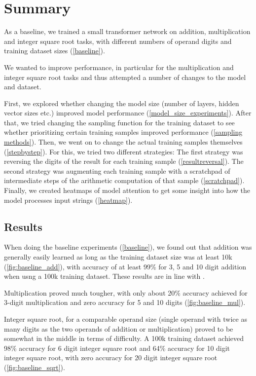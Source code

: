\section{Summary}

As a baseline, we trained a small transformer network on addition, multiplication and integer square root tasks, with different numbers of operand digits and training dataset sizes (\cref{baseline}).

We wanted to improve performance, in particular for the multiplication and integer square root tasks and thus attempted a number of changes to the model and dataset.

First, we explored whether changing the model size (number of layers, hidden vector sizes etc.) improved model performance (\cref{model_size_experiments}).
After that, we tried changing the sampling function for the training dataset to see whether prioritizing certain training samples improved performance (\cref{sampling methods}).
Then, we went on to change the actual training samples themselves (\cref{stepbystep}). For this, we tried two different strategies:
The first strategy was reversing the digits of the result for each training sample (\cref{resultreversal}).
The second strategy was augmenting each training sample with a scratchpad of intermediate steps of the arithmetic computation of that sample (\cref{scratchpad}).
Finally, we created heatmaps of model attention to get some insight into how the model processes input strings (\cref{heatmap}).

\subsection{Results}
When doing the baseline experiments (\cref{baseline}), we found out that addition was generally easily learned as long as the training dataset size was at least 10k (\cref{fig:baseline_add}), with accuracy of at least 99\% for 3, 5 and 10 digit addition when usng a 100k training dataset. These results are in line with \cite{teaching}.

Multiplication proved much tougher, with only about 20\% accuracy achieved for 3-digit multiplication and zero accuracy for 5 and 10 digits (\cref{fig:baseline_mul}).

Integer square root, for a comparable operand size (single operand with twice as many digits as the two operands of addition or multiplication) proved to be somewhat in the middle in terms of difficulty. A 100k training dataset achieved 98\% accuracy for 6 digit integer square root and 64\% accuracy for 10 digit integer square root, with zero accuracy for 20 digit integer square root (\cref{fig:baseline_sqrt}).

